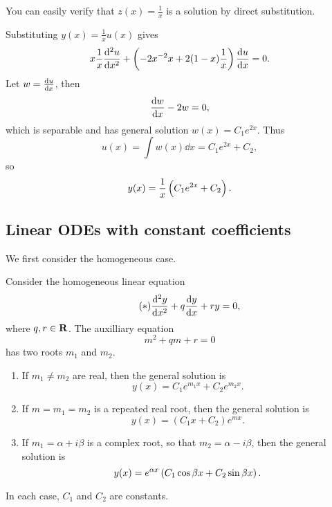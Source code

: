 \begin{solution}
You can easily verify that $z(x)=\frac{1}{x}$ is a solution by direct substitution.

Substituting $y(x)=\frac{1}{x}u(x)$ gives
\[x\frac{1}{x}\dv[2]{u}{x}+\left(-2x^{-2}x+2(1-x)\frac{1}{x}\right)\dv{u}{x}=0.\]
Let $w=\dv{u}{x}$, then
\[\dv{w}{x}-2w=0,\]
which is separable and has general solution $w(x)=C_1e^{2x}$. Thus
\[u(x)=\int w(x)\dd{x}=C_1e^{2x}+C_2,\]
so
\[y(x)=\frac{1}{x}\left(C_1e^{2x}+C_2\right).\]
\end{solution}

\subsection{Linear ODEs with constant coefficients}
We first consider the homogeneous case.
\begin{theorem}
Consider the homogeneous linear equation
\begin{equation*}\tag{$\ast$}
\dv[2]{y}{x}+q\dv{y}{x}+ry=0,
\end{equation*}
where $q,r\in\mathbf R$. The auxilliary equation
\[m^2+qm+r=0\]
has two roots $m_1$ and $m_2$.
\begin{enumerate}[label=(\roman*)]
\item If $m_1\neq m_2$ are real, then the general solution is
\[y(x)=C_1e^{m_1x}+C_2e^{m_2x}.\]
\item If $m=m_1=m_2$ is a repeated real root, then the general solution is
\[y(x)=(C_1x+C_2)e^{mx}.\]
\item If $m_1=\alpha+i\beta$ is a complex root, so that $m_2=\alpha-i\beta$, then the general solution is
\[y(x)=e^{\alpha x}\left(C_1\cos\beta x+C_2\sin\beta x\right).\]
\end{enumerate}
In each case, $C_1$ and $C_2$ are constants.
\end{theorem}

